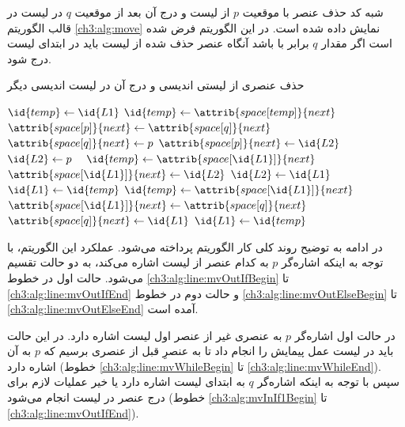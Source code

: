 {شبه کد حذف عنصر با موقعیت {$p$} از لیست {} و درج آن بعد از موقعیت {$q$} در لیست {} در قالب الگوریتم {\eqref{ch3:alg:move}} نمایش داده شده است. در این الگوریتم فرض شده است اگر مقدار {$q$} برابر با {} باشد آنگاه عنصر حذف شده از لیست {} باید در ابتدای لیست {} درج شود.
\begin{algorithm}
\caption{حذف عنصری از لیستی اندیسی و درج آن در لیست اندیسی دیگر}\label{ch3:alg:move}
\begin{latin}
\begin{algorithmic}[1]
		\label{ch3:alg:line:mvOutIfBegin}
				\State	$\id{temp} \gets \id{L1}$
				\label{ch3:alg:line:mvWhileBegin}
						\State	$\id{temp} \gets \attrib{space[temp]}{next}$
				\EndWhile\ \label{ch3:alg:line:mvWhileEnd}
				\label{ch3:alg:mvInIf1Begin}
						\State	$\attrib{space[p]}{next} \gets \attrib{space[q]}{next}$
						\State	$\attrib{space[q]}{next} \gets p$
				\Else
						\State	$\attrib{space[p]}{next} \gets \id{L2}$
						\State	$\id{L2} \gets p$
				\EndIf\ \label{ch3:alg:line:mvOutIfEnd}
		\Else
				\label{ch3:alg:line:mvOutElseBegin}
						\State	$\id{temp} \gets \attrib{space[\id{L1}]}{next}$
						\State	$\attrib{space[\id{L1}]}{next} \gets \id{L2}$
						\State	$\id{L2} \gets \id{L1}$
						\State	$\id{L1} \gets \id{temp}$
				\Else
						\State	$\id{temp} \gets \attrib{space[\id{L1}]}{next}$
						\State	$\attrib{space[\id{L1}]}{next} \gets \attrib{space[q]}{next}$
						\State	$\attrib{space[q]}{next} \gets \id{L1}$
						\State	$\id{L1} \gets \id{temp}$
				\EndIf
		\EndIf\ \label{ch3:alg:line:mvOutElseEnd}
\EndProcedure
\end{algorithmic}
\end{latin}
\end{algorithm}

در ادامه به توضیح روند کلی کار الگوریتم پرداخته می‌شود. عملکرد این الگوریتم، با توجه به اینکه اشاره‌گر {$p$} به کدام عنصر از لیست {} اشاره می‌کند، به دو حالت تقسیم می‌شود. حالت اول در خطوط {\ref{ch3:alg:line:mvOutIfBegin}} تا {\ref{ch3:alg:line:mvOutIfEnd}} و حالت دوم در خطوط {\ref{ch3:alg:line:mvOutElseBegin}} تا {\ref{ch3:alg:line:mvOutElseEnd}} آمده است.

در حالت اول اشاره‌گر {$p$} به عنصری غیر از عنصر اول لیست {} اشاره دارد. در این حالت باید در لیست {} عمل پیمایش را انجام داد تا به عنصرِ قبل از عنصری برسیم که {$p$} به آن اشاره دارد (خطوط {\ref{ch3:alg:line:mvWhileBegin}} تا {\ref{ch3:alg:line:mvWhileEnd}}). سپس با توجه به اینکه اشاره‌گر {$q$} به ابتدای لیست {} اشاره دارد یا خیر عملیات لازم برای درج عنصر در لیست {} انجام می‌شود (خطوط {\ref{ch3:alg:mvInIf1Begin}} تا {\ref{ch3:alg:line:mvOutIfEnd}}).

}
